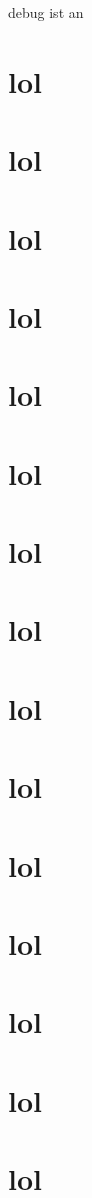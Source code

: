 \ifdebug{}debug ist an\fi

\section{lol}
\section{lol}
\section{lol}
\section{lol}
\section{lol}
\section{lol}
\section{lol}
\section{lol}
\section{lol}
\section{lol}
\section{lol}
\section{lol}
\section{lol}
\section{lol}
\section{lol}
